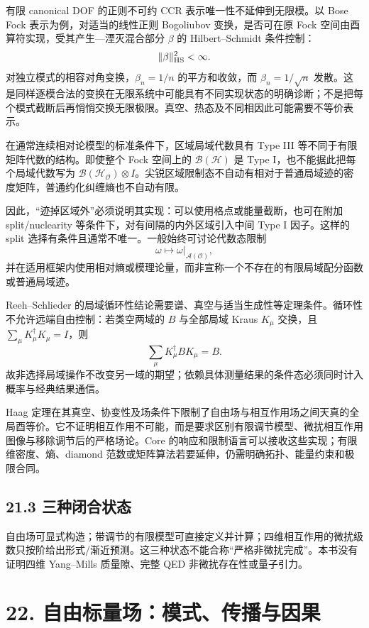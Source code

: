 \documentclass[
  11pt,
  oneside]{book}
\begin{document}
有限 canonical DOF 的正则不可约 CCR 表示唯一性不延伸到无限模。以 Bose
Fock 表示为例，对适当的线性正则 Bogoliubov 变换，是否可在原 Fock
空间由酉算符实现，受其产生---湮灭混合部分 \(\beta\) 的 Hilbert--Schmidt
条件控制： \[
\|\beta\|_{\rm HS}^2<\infty.
\] 对独立模式的相容对角变换，\(\beta_n=1/n\) 的平方和收敛，而
\(\beta_n=1/\sqrt n\)
发散。这是同样逐模合法的变换在无限系统中可能具有不同实现状态的明确诊断；不是把每个模式截断后再悄悄交换无限极限。真空、热态及不同相因此可能需要不等价表示。

在通常连续相对论模型的标准条件下，区域局域代数具有 Type III
等不同于有限矩阵代数的结构。即使整个 Fock 空间上的
\(\mathcal B(\mathcal H)\) 是 Type I，也不能据此把每个局域代数写为
\(\mathcal B(\mathcal H_{\mathcal O})\otimes I\)。尖锐区域限制态不自动有相对于普通局域迹的密度矩阵，普通约化纠缠熵也不自动有限。

因此，``迹掉区域外''必须说明其实现：可以使用格点或能量截断，也可在附加
split/nuclearity 等条件下，对有间隔的内外区域引入中间 Type I
因子。这样的 split 选择有条件且通常不唯一。一般始终可讨论代数态限制 \[
\omega\longmapsto\omega|_{\mathcal A(\mathcal O)},
\]
并在适用框架内使用相对熵或模理论量，而非宣称一个不存在的有限局域配分函数或普通局域迹。

Reeh--Schlieder
的局域循环性结论需要谱、真空与适当生成性等定理条件。循环性不允许远端自由控制：若类空两域的
\(B\) 与全部局域 Kraus \(K_\mu\) 交换，且
\(\sum_\mu K_\mu^\dagger K_\mu=I\)，则 \[
\sum_\mu K_\mu^\dagger B K_\mu=B.
\]
故非选择局域操作不改变另一域的期望；依赖具体测量结果的条件态必须同时计入概率与经典结果通信。

Haag
定理在其真空、协变性及场条件下限制了自由场与相互作用场之间天真的全局酉等价。它不证明相互作用不可能，而是要求区别有限调节模型、微扰相互作用图像与移除调节后的严格场论。Core
的响应和限制语言可以接收这些实现；有限维密度、熵、diamond
范数或矩阵算法若要延伸，仍需明确拓扑、能量约束和极限合同。

\hypertarget{ux4e09ux79cdux95edux5408ux72b6ux6001}{%
\section{21.3 三种闭合状态}\label{ux4e09ux79cdux95edux5408ux72b6ux6001}}

自由场可显式构造；带调节的有限模型可直接定义并计算；四维相互作用的微扰级数只按阶给出形式/渐近预测。这三种状态不能合称``严格非微扰完成''。本书没有证明四维
Yang--Mills 质量隙、完整 QED 非微扰存在性或量子引力。

\hypertarget{ch-22}{%
\chapter{22. 自由标量场：模式、传播与因果}\label{ch-22}}
\end{document}
